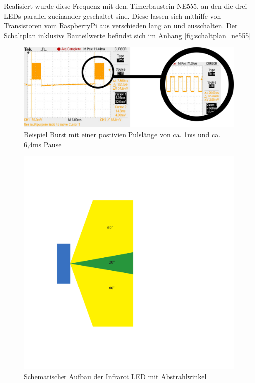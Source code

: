 Realisiert wurde diese Frequenz mit dem Timerbaustein NE555, an den die drei LEDs parallel zueinander geschaltet sind. Diese lassen sich mithilfe von Transistoren vom RaspberryPi aus verschieden lang an und ausschalten. Der Schaltplan inklusive Bauteilwerte befindet sich im Anhang \ref{fig:schaltplan_ne555}

\begin{figure}[!h]
	\includegraphics[width=\textwidth]{images/ir_burst_with_zoom.pdf}
	\caption{Beispiel Burst mit einer postivien Pulslänge von ca. 1ms und ca. 6,4ms Pause}
	\label{fig:ir_burst}
\end{figure}

\begin{figure}[!h]
	\centering
	\includegraphics[width=\textwidth]{images/ir_led_aufbau.pdf}
	\caption{Schematischer Aufbau der Infrarot LED mit Abstrahlwinkel}
	\label{fig:ir_led_aufbau}
\end{figure}

